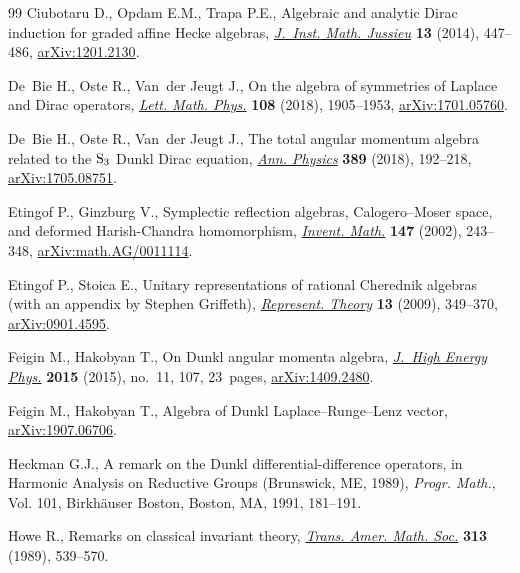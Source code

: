 \documentclass[pdftex]{sigma}
\numberwithin{equation}{section}
\begin{document}
\begin{thebibliography}{99}
Ciubotaru D., Opdam E.M., Trapa P.E., Algebraic and analytic {D}irac induction
 for graded affine {H}ecke algebras, \href{https://doi.org/10.1017/S147474801300008X}{\textit{J.~Inst. Math. Jussieu}}
 \textbf{13} (2014), 447--486, \href{https://arxiv.org/abs/1201.2130}{arXiv:1201.2130}.

De~Bie H., Oste R., Van~der Jeugt J., On the algebra of symmetries of {L}aplace
 and {D}irac operators, \href{https://doi.org/10.1007/s11005-018-1065-0}{\textit{Lett. Math. Phys.}} \textbf{108} (2018),
 1905--1953, \href{https://arxiv.org/abs/1701.05760}{arXiv:1701.05760}.

De~Bie H., Oste R., Van~der Jeugt J., The total angular momentum algebra
 related to the {${\rm S}_3$} {D}unkl {D}irac equation, \href{https://doi.org/10.1016/j.aop.2017.12.015}{\textit{Ann. Physics}}
 \textbf{389} (2018), 192--218, \href{https://arxiv.org/abs/1705.08751}{arXiv:1705.08751}.

Etingof P., Ginzburg V., Symplectic reflection algebras, {C}alogero--{M}oser
 space, and deformed {H}arish-{C}handra homomorphism, \href{https://doi.org/10.1007/s002220100171}{\textit{Invent. Math.}}
 \textbf{147} (2002), 243--348, \href{https://arxiv.org/abs/math.AG/0011114}{arXiv:math.AG/0011114}.

Etingof P., Stoica E., Unitary representations of rational {C}herednik algebras
 (with an appendix by {S}tephen {G}riffeth), \href{https://doi.org/10.1090/S1088-4165-09-00356-2}{\textit{Represent. Theory}}
 \textbf{13} (2009), 349--370, \href{https://arxiv.org/abs/0901.4595}{arXiv:0901.4595}.

Feigin M., Hakobyan T., On {D}unkl angular momenta algebra, \href{https://doi.org/10.1007/JHEP11(2015)107}{\textit{J.~High
 Energy Phys.}} \textbf{2015} (2015), no.~11, 107, 23~pages,
 \href{https://arxiv.org/abs/1409.2480}{arXiv:1409.2480}.

Feigin M., Hakobyan T., Algebra of {D}unkl {L}aplace--{R}unge--{L}enz vector,
 \href{https://arxiv.org/abs/1907.06706}{arXiv:1907.06706}.

Heckman G.J., A remark on the {D}unkl differential-difference operators, in
 Harmonic Analysis on Reductive Groups ({B}runswick, {ME}, 1989),
 \textit{Progr. Math.}, Vol. 101, Birkh\"auser Boston, Boston, MA, 1991,
 181--191.

Howe R., Remarks on classical invariant theory, \href{https://doi.org/10.2307/2001418}{\textit{Trans. Amer. Math.
 Soc.}} \textbf{313} (1989), 539--570.


\end{thebibliography}
\end{document}
